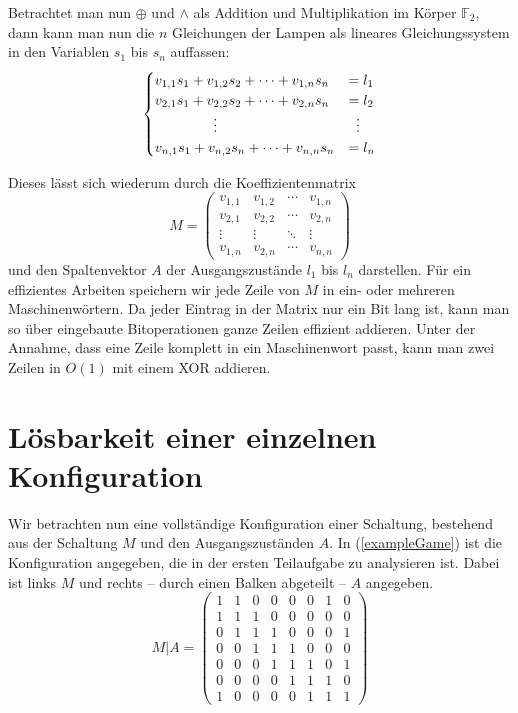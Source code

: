 \documentclass{scrartcl}
\newcommand{\ftwo}{\ensuremath{\mathbb F_2}}
\newcommand{\bigO}{O}
\newcommand{\xor}{\oplus}
\begin{document}
Betrachtet man nun $\xor$ und $\land$ als Addition und Multiplikation im Körper
\ftwo, dann kann man nun die $n$ Gleichungen der Lampen als lineares
Gleichungssystem in den Variablen $s_1$ bis $s_n$ auffassen:
\begin{equation}
\begin{cases}
  v_{1,1}s_1+v_{1,2}s_2+\dots+v_{1,n}s_n&=l_1\\
  v_{2,1}s_1+v_{2,2}s_2+\dots+v_{2,n}s_n&=l_2\\
  \hfil\vdots\hfil&\hfil\vdots\hfil\\
  v_{n,1}s_1+v_{n,2}s_n+\dots+v_{n,n}s_n&=l_n\\
\end{cases}
\end{equation}

Dieses lässt sich wiederum durch die Koeffizientenmatrix
\begin{equation}
M=
\begin{pmatrix}
  v_{1,1}&v_{1,2}&\cdots&v_{1,n}\\
  v_{2,1}&v_{2,2}&\cdots&v_{2,n}\\
  \vdots &\vdots &\ddots&\vdots\\
  v_{1,n}&v_{2,n}&\cdots&v_{n,n}
\end{pmatrix}
\end{equation}
und den Spaltenvektor $A$ der Ausgangszustände $l_1$ bis $l_n$ darstellen. Für
ein effizientes Arbeiten speichern wir jede Zeile von $M$ in ein- oder mehreren
Maschinenwörtern. Da jeder Eintrag in der Matrix nur ein Bit lang ist, kann man
so über eingebaute Bitoperationen ganze Zeilen effizient addieren. Unter der
Annahme, dass eine Zeile komplett in ein Maschinenwort passt, kann man zwei
Zeilen in $\bigO(1)$ mit einem XOR addieren.

\section{Lösbarkeit einer einzelnen Konfiguration}
Wir betrachten nun eine vollständige Konfiguration einer Schaltung, bestehend
aus der Schaltung $M$ und den Ausgangszuständen $A$. In (\ref{exampleGame}) ist
die Konfiguration angegeben, die in der ersten Teilaufgabe zu analysieren ist.
Dabei ist links $M$ und rechts -- durch einen Balken abgeteilt -- $A$ angegeben.
\begin{equation}
M\vert A=\left(
\begin{array}{ccccccc|c}
  1&1&0&0&0&0&1&0\\
  1&1&1&0&0&0&0&0\\
  0&1&1&1&0&0&0&1\\
  0&0&1&1&1&0&0&0\\
  0&0&0&1&1&1&0&1\\
  0&0&0&0&1&1&1&0\\
  1&0&0&0&0&1&1&1 
\end{array}\right)\label{exampleGame}
\end{equation}
\end{document}
